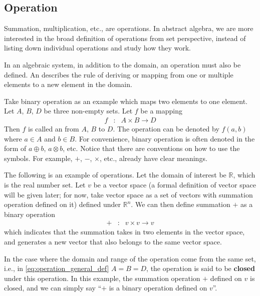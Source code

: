 \subsection{Operation}

Summation, multiplication, etc., are operations. In abstract algebra, we are more interested in the broad definition of operations from set perspective, instead of listing down individual operations and study how they work. 

In an algebraic system, in addition to the domain, an operation must also be defined. An  describes the rule of deriving or mapping from one or multiple elements to a new element in the domain. 

Take binary operation as an example which maps two elements to one element. Let $A$, $B$, $D$ be three non-empty sets. Let $f$ be a mapping
\begin{eqnarray}
	f &:& A \times B \rightarrow D \label{eq:operation_general_def}
\end{eqnarray}
Then $f$ is called an  from $A$, $B$ to $D$. The operation can be denoted by $f(a,b)$ where $a\in A$ and $b\in B$. For convenience, binary operation is often denoted in the form of $a\oplus b$, $a\otimes b$, etc. Notice that there are conventions on how to use the symbols. For example, $+$, $-$, $\times$, etc., already have clear meanings.

The following is an example of operations. Let the domain of interest be $\mathbb{R}$, which is the real number set. Let $v$ be a vector space (a formal definition of vector space will be given later; for now, take vector space as a set of vectors with summation operation defined on it) defined under $\mathbb{R}^n$. We can then define summation $+$ as a binary operation
\begin{eqnarray}
	+ &:& v\times v \rightarrow v \nonumber
\end{eqnarray} 
which indicates that the summation takes in two elements in the vector space, and generates a new vector that also belongs to the same vector space. 

In the case where the domain and range of the operation come from the same set, i.e., in \eqref{eq:operation_general_def} $A=B=D$, the operation is said to be \textbf{closed} under this operation. In this example, the summation operation $+$ defined on $v$ is closed, and we can simply say ``$+$ is a binary operation defined on $v$''.

